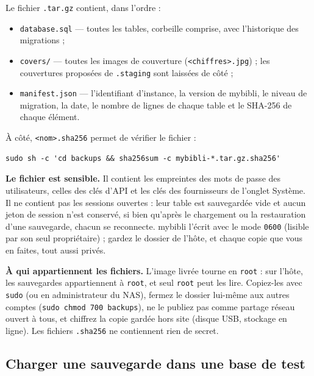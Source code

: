 Le fichier \texttt{.tar.gz} contient, dans l'ordre :
\begin{itemize}
  \item \texttt{database.sql} — toutes les tables, corbeille comprise,
        avec l'historique des migrations ;
  \item \texttt{covers/} — toutes les images de couverture
        (\texttt{<chiffres>.jpg}) ; les couvertures proposées de
        \texttt{.staging} sont laissées de côté ;
  \item \texttt{manifest.json} — l'identifiant d'instance, la version
        de mybibli, le niveau de migration, la date, le nombre de
        lignes de chaque table et le SHA-256 de chaque élément.
\end{itemize}
À côté, \texttt{<nom>.sha256} permet de vérifier le fichier :
\begin{lstlisting}
sudo sh -c 'cd backups && sha256sum -c mybibli-*.tar.gz.sha256'
\end{lstlisting}

\textbf{Le fichier est sensible.} Il
contient les empreintes des mots de passe des utilisateurs, celles des
clés d'API et les clés des fournisseurs de l'onglet Système. Il ne
contient pas les sessions ouvertes : leur table est sauvegardée vide
et aucun jeton de session n'est conservé,
si bien qu'après le chargement ou la restauration d'une sauvegarde,
chacun se reconnecte. mybibli
l'écrit avec le mode \texttt{0600} (lisible par son seul propriétaire)
; gardez le dossier de l'hôte, et chaque copie que vous en faites,
tout aussi privés.

\textbf{À qui appartiennent les fichiers.} L'image livrée tourne en
\texttt{root} : sur l'hôte, les sauvegardes appartiennent à
\texttt{root}, et seul \texttt{root} peut les lire. Copiez-les avec
\texttt{sudo} (ou en administrateur du NAS), fermez le dossier lui-même
aux autres comptes (\texttt{sudo chmod 700 backups}), ne le publiez pas
comme partage réseau ouvert à tous, et chiffrez la copie gardée hors
site (disque USB, stockage en ligne). Les fichiers \texttt{.sha256} ne
contiennent rien de secret.

\subsection*{Charger une sauvegarde dans une base de test}
\label{sec:backups-test-db}

